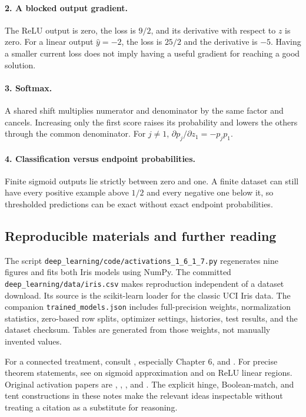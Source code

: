 \paragraph{2. A blocked output gradient.}
The ReLU output is zero, the loss is $9/2$, and its derivative with respect to $z$ is zero. For a linear output $\hat y=-2$, the loss is $25/2$ and the derivative is $-5$. Having a smaller current loss does not imply having a useful gradient for reaching a good solution.

\paragraph{3. Softmax.}
A shared shift multiplies numerator and denominator by the same factor and cancels. Increasing only the first score raises its probability and lowers the others through the common denominator. For $j\neq1$, $\partial p_j/\partial z_1=-p_jp_1$.

\paragraph{4. Classification versus endpoint probabilities.}
Finite sigmoid outputs lie strictly between zero and one. A finite dataset can still have every positive example above $1/2$ and every negative one below it, so thresholded predictions can be exact without exact endpoint probabilities.

\subsection{Reproducible materials and further reading}
The script \texttt{deep\_learning/code/activations\_1\_6\_1\_7.py} regenerates nine figures and fits both Iris models using NumPy. The committed \texttt{deep\_learning/data/iris.csv} makes reproduction independent of a dataset download. Its source is the scikit-learn loader for the classic UCI Iris data. The companion \texttt{trained\_models.json} includes full-precision weights, normalization statistics, zero-based row splits, optimizer settings, histories, test results, and the dataset checksum. Tables are generated from those weights, not manually invented values.

For a connected treatment, consult \citet{goodfellow2016deep}, especially Chapter 6, and \citet{bishop2006pattern}. For precise theorem statements, see \citet{cybenko1989} on sigmoid approximation and \citet{montufar2014} on ReLU linear regions. Original activation papers are \citet{he2015prelu}, \citet{clevert2015elu}, \citet{hendrycks2016gelu}, and \citet{ramachandran2017swish}. The explicit hinge, Boolean-match, and tent constructions in these notes make the relevant ideas inspectable without treating a citation as a substitute for reasoning.
